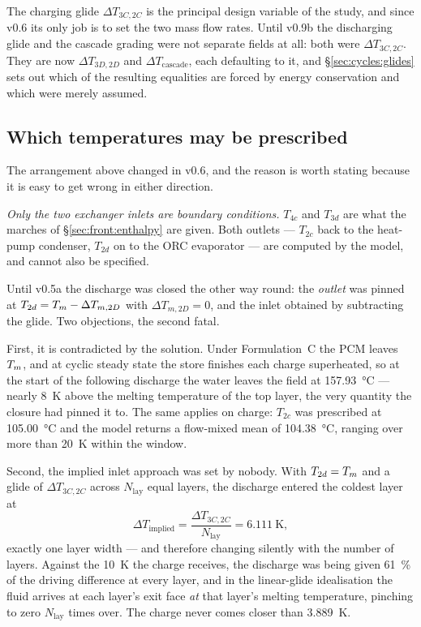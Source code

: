 The charging glide $\Delta T_{3C,2C}$ is the principal design variable of the
study, and since v0.6 its only job is to set the two mass flow rates. Until
v0.9b the discharging glide and the cascade grading were not separate fields at
all: both were $\Delta T_{3C,2C}$. They are now
$\Delta T_{3D,2D}$ and $\Delta T_{\mathrm{cascade}}$, each defaulting to it, and
\S\ref{sec:cycles:glides} sets out which of the resulting equalities are forced
by energy conservation and which were merely assumed.

\subsection{Which temperatures may be prescribed}
\label{sec:cycles:closure}

The arrangement above changed in v0.6, and the reason is worth stating because
it is easy to get wrong in either direction.

\emph{Only the two exchanger inlets are boundary conditions.} $T_{4c}$ and
$T_{3d}$ are what the marches of \S\ref{sec:front:enthalpy} are given. Both
outlets --- $T_{2c}$ back to the heat-pump condenser, $T_{2d}$ on to the ORC
evaporator --- are computed by the model, and cannot also be specified.

Until v0.5a the discharge was closed the other way round: the \emph{outlet} was
pinned at $T_{2d}=T_{m}-\Delta T_{m,2D}$ with $\Delta T_{m,2D}=0$, and the inlet
obtained by subtracting the glide. Two objections, the second fatal.

First, it is contradicted by the solution. Under Formulation~C the PCM leaves
$T_{m}$, and at cyclic steady state the store finishes each charge superheated, so
at the start of the following discharge the water leaves the field at
\SI{157.93}{\celsius} --- nearly \SI{8}{\kelvin} above the melting temperature of
the top layer, the very quantity the closure had pinned it to. The same applies
on charge: $T_{2c}$ was prescribed at \SI{105.00}{\celsius} and the model
returns a flow-mixed mean of \SI{104.38}{\celsius}, ranging over more than
\SI{20}{\kelvin} within the window.

Second, the implied inlet approach was set by nobody. With $T_{2d}=T_{m}$ and a
glide of $\Delta T_{3C,2C}$ across $N_{\mathrm{lay}}$ equal layers, the
discharge entered the coldest layer at
\begin{equation}
  \Delta T_{\mathrm{implied}}
  = \frac{\Delta T_{3C,2C}}{N_{\mathrm{lay}}}
  = \SI{6.111}{\kelvin},
  \label{eq:implied-approach}
\end{equation}
exactly one layer width --- and therefore changing silently with the number of
layers. Against the \SI{10}{\kelvin} the charge receives, the discharge was
being given \SI{61}{\percent} of the driving difference at every layer, and in
the linear-glide idealisation the fluid arrives at each layer's exit face
\emph{at} that layer's melting temperature, pinching to zero $N_{\mathrm{lay}}$
times over. The charge never comes closer than \SI{3.889}{\kelvin}.

